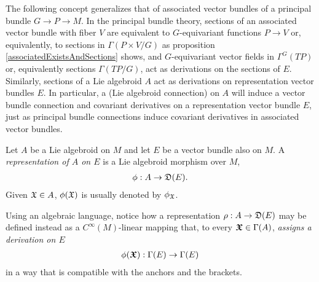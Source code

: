 





\linea

The following concept generalizes that of associated vector bundles of a principal bundle $G \to P \to M$. In the principal bundle theory, sections of an associated vector bundle with fiber $V$ are equivalent to $G$-equivariant functions $P \to V$ or, equivalently, to sections in $\Gamma(P \times V/G)$ as proposition \ref{associatedExistsAndSections} shows, and $G$-equivariant vector fields in $\Gamma^G(TP)$ or, equivalently sections $\Gamma(TP/G)$, act as derivations on the sections of $E$. %
Similarly, sections of a Lie algebroid $A$ act as derivations on representation vector bundles $E$. In particular, a (Lie algebroid connection) on $A$ will induce a vector bundle connection and covariant derivatives on a representation vector bundle $E$, just as principal bundle connections induce covariant derivatives in associated vector bundles.

\begin{definition}%
Let $A$ be a Lie algebroid on $M$ and let $E$ be a vector bundle also on $M$. A \emph{representation of $A$ on $E$} is a Lie algebroid morphism over $M$,
\begin{align}
    \phi: A \to \alg D(E).
\end{align}
Given $\mathfrak{X} \in A$, $\phi(\oid X)$ is usually denoted by $\phi_{\oid X}$.
\end{definition}
Using an algebraic language, notice how a representation $\rho:A \to \mathfrak{D}(E)$ may be defined instead as a $C^\infty(M)$-linear mapping that, to every $\bm{\mathfrak{X}} \in \Gamma(A)$, \emph{assigns a derivation on $E$} 
\begin{align}
    \phi(\sectoid X): \Gamma(E) \to \Gamma(E)
\end{align}
in a way that is compatible with the anchors and the brackets.

